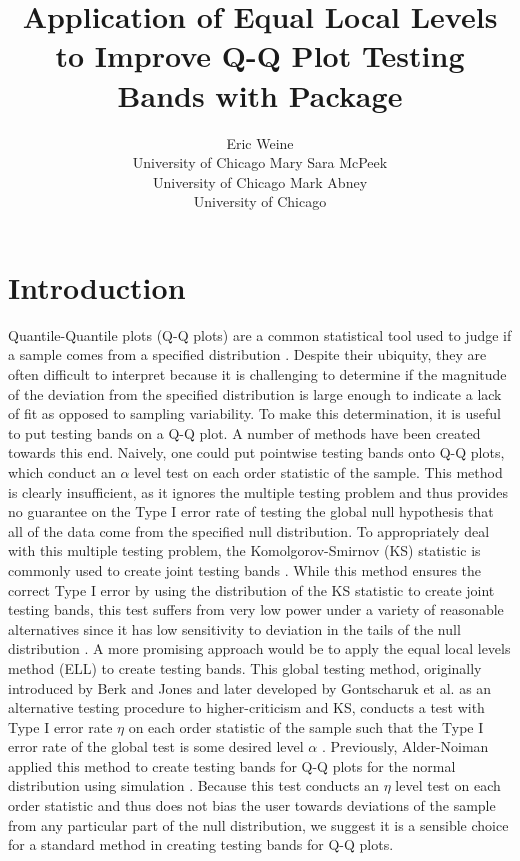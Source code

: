 \documentclass[article]{jss}
\author{Eric Weine\\University of Chicago
   \And Mary Sara McPeek\\University of Chicago
   \And Mark Abney\\University of Chicago}
\title{Application of Equal Local Levels to Improve Q-Q Plot Testing Bands with \proglang{R} Package \pkg{qqconf}}
\begin{document}
\maketitle

\section{Introduction}
Quantile-Quantile plots (Q-Q plots) are a common statistical tool used to judge if a sample comes from a specified distribution \citep{wilk_gnanadesikan_1968}. Despite their ubiquity, they are often difficult to interpret because it is challenging to determine if the magnitude of the deviation from the specified distribution is large enough to indicate a lack of fit as opposed to sampling variability. To make this determination, it is useful to put testing bands on a Q-Q plot.
\newline
\newline
A number of methods have been created towards this end. Naively, one could put pointwise testing bands onto Q-Q plots, which conduct an $\alpha$ level test on each order statistic of the sample. This method is clearly insufficient, as it ignores the multiple testing problem and thus provides no guarantee on the Type I error rate of testing the global null hypothesis that all of the data come from the specified null distribution. To appropriately deal with this multiple testing problem, the Komolgorov-Smirnov (KS) statistic is commonly used to create joint testing bands \citep{kolmogoroff1941confidence, smirnov1944approximate}. While this method ensures the correct Type I error by using the distribution of the KS statistic to create joint testing bands, this test suffers from very low power under a variety of reasonable alternatives since it has low sensitivity to deviation in the tails of the null distribution \citep{aldor2013power, berk1979goodness}. A more promising approach would be to apply the equal local levels method (ELL) to create testing bands. This global testing method, originally introduced by Berk and Jones and later developed by Gontscharuk et al. as an alternative testing procedure to higher-criticism and KS, conducts a test with Type I error rate $\eta$ on each order statistic of the sample such that the Type I error rate of the global test is some desired level $\alpha$ \citep{berk1979goodness, gontscharuk2015intermediates, gontscharuk2016goodness, gontscharuk2017asymptotics}. Previously, Alder-Noiman applied this method to create testing bands for Q-Q plots for the normal distribution using simulation \citep{aldor2013power}. Because this test conducts an $\eta$ level test on each order statistic and thus does not bias the user towards deviations of the sample from any particular part of the null distribution, we suggest it is a sensible choice for a standard method in creating testing bands for Q-Q plots.
\end{document}
